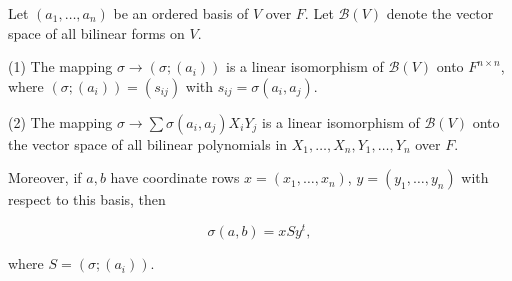 Let $(a_1, \ldots, a_n)$ be an ordered basis of $V$ over $F$. Let $\mathcal{B}(V)$ denote the vector space of all bilinear forms on $V$.

(1) The mapping $\sigma \rightarrow (\sigma; (a_i))$ is a linear isomorphism of $\mathcal{B}(V)$ onto $F^{n \times n}$, where $(\sigma; (a_i)) = (s_{ij})$ with $s_{ij} = \sigma(a_i, a_j)$.

(2) The mapping $\sigma \rightarrow \sum \sigma(a_i, a_j) X_i Y_j$ is a linear isomorphism of $\mathcal{B}(V)$ onto the vector space of all bilinear polynomials in $X_1, \ldots, X_n, Y_1, \ldots, Y_n$ over $F$.

Moreover, if $a, b$ have coordinate rows $x = (x_1, \ldots, x_n)$, $y = (y_1, \ldots, y_n)$ with respect to this basis, then

$$\sigma(a, b) = x S y^t,$$

where $S = (\sigma; (a_i))$.
